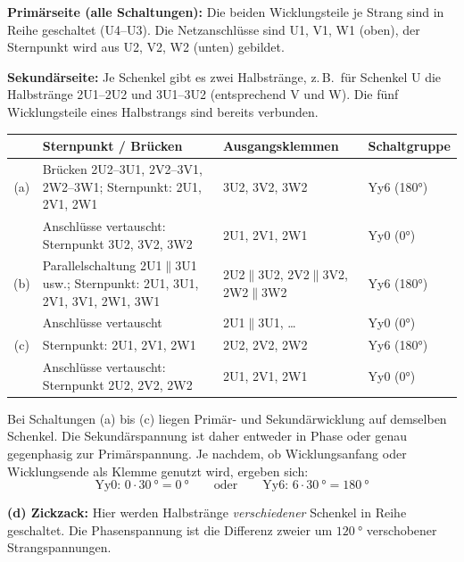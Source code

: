 \documentclass[a4paper,11pt]{scrreprt}
\renewcommand{\arraystretch}{1.3}
\begin{document}
\textbf{Primärseite (alle Schaltungen):} Die beiden Wicklungsteile je Strang sind in Reihe geschaltet (U4--U3). Die Netzanschlüsse sind U1, V1, W1 (oben), der Sternpunkt wird aus U2, V2, W2 (unten) gebildet.

\textbf{Sekundärseite:} Je Schenkel gibt es zwei Halbstränge, z.\,B.\ für Schenkel U die Halbstränge 2U1--2U2 und 3U1--3U2 (entsprechend V und W). Die fünf Wicklungsteile eines Halbstrangs sind bereits verbunden.

\begin{center}
\small
\renewcommand{\arraystretch}{1.25}
\begin{tabular}{@{}cp{4.3cm}p{4.3cm}p{2.6cm}@{}}
\toprule
 & Sternpunkt / Brücken & Ausgangsklemmen & Schaltgruppe\\
\midrule
(a) & Brücken 2U2--3U1, 2V2--3V1, 2W2--3W1; Sternpunkt: 2U1, 2V1, 2W1 & 3U2, 3V2, 3W2 & Yy6 (180°)\\
    & Anschlüsse vertauscht: Sternpunkt 3U2, 3V2, 3W2 & 2U1, 2V1, 2W1 & Yy0 (0°)\\
\midrule
(b) & Parallelschaltung 2U1$\parallel$3U1 usw.; Sternpunkt: 2U1, 3U1, 2V1, 3V1, 2W1, 3W1 & 2U2$\parallel$3U2, 2V2$\parallel$3V2, 2W2$\parallel$3W2 & Yy6 (180°)\\
    & Anschlüsse vertauscht & 2U1$\parallel$3U1, \ldots & Yy0 (0°)\\
\midrule
(c) & Sternpunkt: 2U1, 2V1, 2W1 & 2U2, 2V2, 2W2 & Yy6 (180°)\\
    & Anschlüsse vertauscht: Sternpunkt 2U2, 2V2, 2W2 & 2U1, 2V1, 2W1 & Yy0 (0°)\\
\bottomrule
\end{tabular}
\end{center}

Bei Schaltungen (a) bis (c) liegen Primär- und Sekundärwicklung auf demselben Schenkel. Die Sekundärspannung ist daher entweder in Phase oder genau gegenphasig zur Primärspannung. Je nachdem, ob Wicklungsanfang oder Wicklungsende als Klemme genutzt wird, ergeben sich:
\begin{equation*}
  \text{Yy0: } 0\cdot\SI{30}{\degree} = \SI{0}{\degree}
  \qquad\text{oder}\qquad
  \text{Yy6: } 6\cdot\SI{30}{\degree} = \SI{180}{\degree}
\end{equation*}

\textbf{(d) Zickzack:} Hier werden Halbstränge \emph{verschiedener} Schenkel in Reihe geschaltet. Die Phasenspannung ist die Differenz zweier um $\SI{120}{\degree}$ verschobener Strangspannungen.
\end{document}
